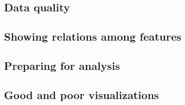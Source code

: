 
\subsection{Data quality}
\subsection{Showing relations among features}
\subsection{Preparing for analysis}
\subsection{Good and poor visualizations}
